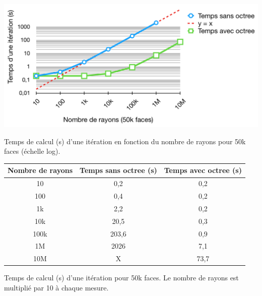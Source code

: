  \begin{figureth}
	\includegraphics[width=\linewidth]{images/complexite2}
	\caption{Temps de calcul (s) d'une itération en fonction du nombre de rayons pour 50k faces (échelle log).}
	\label{complexite2}
\end{figureth}

\begin{tableth}
	\begin{tabular}{| c | c | c |}
		\hline
		Nombre de rayons & Temps \textbf{sans} \gls{octree} (s)& Temps \textbf{avec} \gls{octree} (s)\\
		  \hline
		  \hline
		   10 &0,2&	0,2 \\
		   \hline
		100 &0,4	&0,2 \\
		   \hline
		1k & 2,2	&0,2\\
		   \hline
		10k & 20,5&	0,3\\
		   \hline
		100k & 203,6&	0,9\\
		   \hline
		1M &2026 &	7,1 \\
		\hline
		10M & X &	73,7 \\
		\hline
	 \end{tabular}
	\caption{Temps de calcul (s) d'une itération pour 50k faces. Le nombre de rayons est multiplié par 10 à chaque mesure.}
	\label{tabComplexite2}
\end{tableth}

